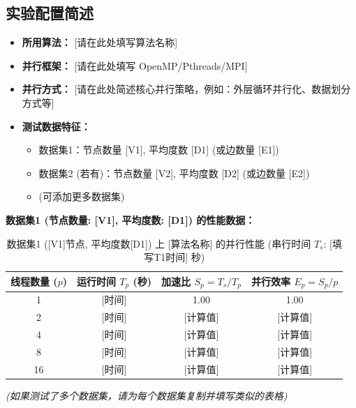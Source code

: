 \documentclass{SYSUReport}
\begin{document}
\subsection{实验配置简述}
\begin{itemize}
    \item \textbf{所用算法：} [请在此处填写算法名称]
    \item \textbf{并行框架：} [请在此处填写 OpenMP/Pthreads/MPI]
    \item \textbf{并行方式：} [请在此处简述核心并行策略，例如：外层循环并行化、数据划分方式等]
    \item \textbf{测试数据特征：}
        \begin{itemize}
            \item 数据集1：节点数量 [V1], 平均度数 [D1] (或边数量 [E1])
            \item 数据集2 (若有)：节点数量 [V2], 平均度数 [D2] (或边数量 [E2])
            \item (可添加更多数据集)
        \end{itemize}
\end{itemize}
\textbf{数据集1 (节点数量: [V1], 平均度数: [D1]) 的性能数据：}
\begin{table}[H]
  \centering
  \caption{数据集1 ([V1]节点, 平均度数[D1]) 上 [算法名称] 的并行性能 (串行时间 $T_s$: [填写T1时间] 秒)}
  \label{tab:results_dataset1}
  \begin{tabular}{cccc}
    \toprule
    \textbf{线程数量 ($p$)} & \textbf{运行时间 $T_p$ (秒)} & \textbf{加速比 $S_p = T_s / T_p$} & \textbf{并行效率 $E_p = S_p / p$} \\
    \midrule
    1   & [时间] & 1.00     & 1.00      \\
    2   & [时间] & [计算值] & [计算值]  \\
    4   & [时间] & [计算值] & [计算值]  \\
    8   & [时间] & [计算值] & [计算值]  \\
    16  & [时间] & [计算值] & [计算值]  \\
    \bottomrule
  \end{tabular}
\end{table}

\textit{(如果测试了多个数据集，请为每个数据集复制并填写类似的表格)}
\end{document}
